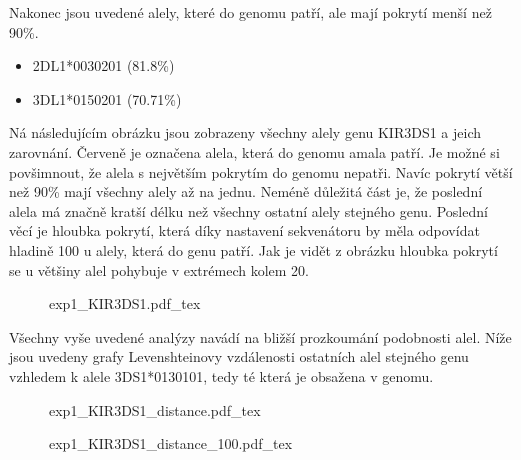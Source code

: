 \documentclass[czech,DP]{thesiskiv}
\numberwithin{equation}{section}
\begin{document}
\noindent
Nakonec jsou uvedené alely, které do genomu patří, ale mají pokrytí menší než 90\%.

\begin{multicols}{2}
\begin{itemize}
	\itemsep0em
	\item 2DL1*0030201 (81.8\%)
	\item 3DL1*0150201 (70.71\%)
\end{itemize}
\end{multicols}

\noindent
Ná následujícím obrázku jsou zobrazeny všechny alely genu KIR3DS1 a jeich zarovnání. Červeně je označena alela, která do genomu amala patří. Je možné si povšimnout, že alela s největším pokrytím do genomu nepatři. Navíc pokrytí větší než 90\% mají všechny alely až na jednu. Neméně důležitá část je, že poslední alela má značně kratší délku než všechny ostatní alely stejného genu. Poslední věcí je hloubka pokrytí, která díky nastavení sekvenátoru by měla odpovídat hladině 100 u alely, která do genu patří. Jak je vidět z obrázku hloubka pokrytí se u většiny alel pohybuje v extrémech kolem 20. 

\begin{figure}[H]
    \centering
    \def\svgwidth{\columnwidth}
    {exp1_KIR3DS1.pdf_tex} 
\end{figure}

\noindent
Všechny vyše uvedené analýzy navádí na bližší prozkoumání podobnosti alel. Níže jsou uvedeny grafy Levenshteinovy vzdálenosti ostatních alel stejného genu vzhledem k alele 3DS1*0130101, tedy té která je obsažena v genomu.

\begin{figure}[H]
	\centering
    \def\svgwidth{\columnwidth}
    {exp1_KIR3DS1_distance.pdf_tex} 
\end{figure}

\begin{figure}[H]
	\centering
    \def\svgwidth{\columnwidth}
    {exp1_KIR3DS1_distance_100.pdf_tex} 
\end{figure}
 
\end{document}
